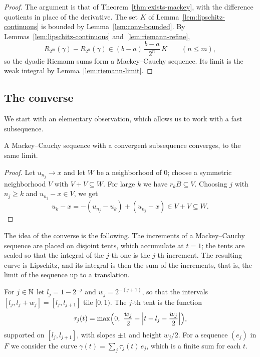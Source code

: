 \begin{proof}
  \leanok
  The argument is that of Theorem~\ref{thm:exists-mackey}, with the difference quotients in
  place of the derivative. The set $K$ of Lemma~\ref{lem:lipschitz-continuous} is bounded by
  Lemma~\ref{lem:conv-bounded}. By Lemmas~\ref{lem:lipschitz-continuous}
  and~\ref{lem:riemann-refine},
  \[
    R_{2^m}(\gamma) - R_{2^n}(\gamma) \in (b - a)\,\frac{b - a}{2^n}\, K \qquad (n \leq m),
  \]
  so the dyadic Riemann sums form a Mackey--Cauchy sequence. Its limit is the weak integral by
  Lemma~\ref{lem:riemann-limit}.
\end{proof}

\subsection{The converse}

We start with an elementary observation, which allows us to work with a fast subsequence.

\begin{lemma}[Subsequences]
  \label{lem:mackey-subseq}
  \leanok
  A Mackey--Cauchy sequence with a convergent subsequence converges, to the same limit.
\end{lemma}

\begin{proof}
  \leanok
  Let $u_{n_j} \to x$ and let $W$ be a neighborhood of $0$; choose a symmetric neighborhood $V$
  with $V + V \subseteq W$. For large $k$ we have $r_k B \subseteq V$. Choosing $j$ with
  $n_j \geq k$ and $u_{n_j} - x \in V$, we get
  \[
    u_k - x = -(u_{n_j} - u_k) + (u_{n_j} - x) \in V + V \subseteq W .
  \]
\end{proof}

The idea of the converse is the following. The increments of a Mackey--Cauchy sequence are
placed on disjoint tents, which accumulate at $t = 1$; the tents are scaled so that the
integral of the $j$-th one is the $j$-th increment. The resulting curve is Lipschitz, and its
integral is then the sum of the increments, that is, the limit of the sequence up to a
translation.

\begin{definition}[Tents]
  \label{def:tents}
  \leanok
  For $j \in \mathbb{N}$ let $l_j = 1 - 2^{-j}$ and $w_j = 2^{-(j+1)}$, so that the intervals
  $[l_j, l_j + w_j] = [l_j, l_{j+1}]$ tile $[0, 1)$. The $j$-th tent is the function
  \[
    \tau_j(t) = \max\Bigl(0,\ \frac{w_j}{2} - \Bigl|t - l_j - \frac{w_j}{2}\Bigr|\Bigr),
  \]
  supported on $[l_j, l_{j+1}]$, with slopes $\pm 1$ and height $w_j / 2$. For a sequence
  $(e_j)$ in $F$ we consider the curve $\gamma(t) = \sum_j \tau_j(t)\, e_j$, which is a finite
  sum for each $t$.
\end{definition}

